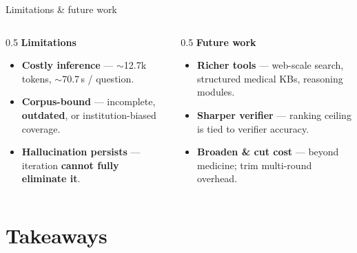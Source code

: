 \documentclass[10pt, aspectratio=169, t]{beamer}   %
\newcommand{\warn}[1]{{\color{negmag}\bfseries #1}}   %
\newcommand{\blue}{\color{posblue}\bfseries}  %
\begin{document}
\begin{frame}{Limitations \& future work}
  \vfill
  \begin{columns}[T]
    \begin{column}{0.5\textwidth}
      {\large\bfseries\color{negmag} Limitations}
      \medskip
      \begin{itemize}\setlength{\itemsep}{14pt}
        \item \textbf{Costly inference} — $\sim$12.7k tokens, $\sim$70.7\,s / question.
        \item \textbf{Corpus-bound} — incomplete, \warn{outdated}, or institution-biased coverage.
        \item \textbf{Hallucination persists} — iteration \warn{cannot fully eliminate it}.
      \end{itemize}
    \end{column}
    \begin{column}{0.5\textwidth}
      {\large\bfseries\blue Future work}
      \medskip
      \begin{itemize}\setlength{\itemsep}{14pt}
        \item \textbf{Richer tools} — web-scale search, structured medical KBs, reasoning modules.
        \item \textbf{Sharper verifier} — ranking ceiling is tied to verifier accuracy.
        \item \textbf{Broaden \& cut cost} — beyond medicine; trim multi-round overhead.
      \end{itemize}
    \end{column}
  \end{columns}
  \vfill
\end{frame}

\section{Takeaways}
\end{document}

